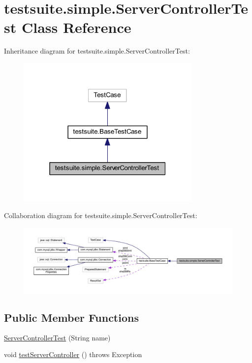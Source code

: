 \hypertarget{classtestsuite_1_1simple_1_1_server_controller_test}{}\section{testsuite.\+simple.\+Server\+Controller\+Test Class Reference}
\label{classtestsuite_1_1simple_1_1_server_controller_test}


Inheritance diagram for testsuite.\+simple.\+Server\+Controller\+Test\+:
\nopagebreak
\begin{figure}[H]
\begin{center}
\leavevmode
\includegraphics[width=256pt]{classtestsuite_1_1simple_1_1_server_controller_test__inherit__graph}
\end{center}
\end{figure}


Collaboration diagram for testsuite.\+simple.\+Server\+Controller\+Test\+:
\nopagebreak
\begin{figure}[H]
\begin{center}
\leavevmode
\includegraphics[width=350pt]{classtestsuite_1_1simple_1_1_server_controller_test__coll__graph}
\end{center}
\end{figure}
\subsection*{Public Member Functions}
\begin{DoxyCompactItemize}
\item 
\mbox{\hyperlink{classtestsuite_1_1simple_1_1_server_controller_test_aed48ef46008c20609af703e32af46073}{Server\+Controller\+Test}} (String name)
\item 
void \mbox{\hyperlink{classtestsuite_1_1simple_1_1_server_controller_test_a8a596dbd3bd3be8d4e90da85076c393e}{test\+Server\+Controller}} ()  throws Exception 
\end{DoxyCompactItemize}
